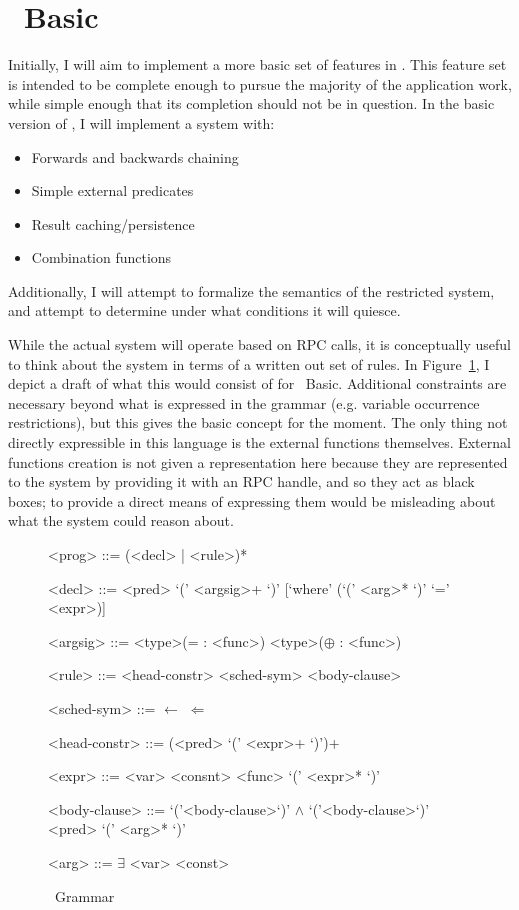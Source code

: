 \section{\sysname\ Basic}
\label{sec:holmesBasic}
Initially, I will aim to implement a more basic set of features in \sysname.
This feature set is intended to be complete enough to pursue the majority of the application work, while simple enough that its completion should not be in question.
In the basic version of \sysname, I will implement a system with:
\begin{itemize}
\item Forwards and backwards chaining
\item Simple external predicates
\item Result caching/persistence
\item Combination functions
\end{itemize}
Additionally, I will attempt to formalize the semantics of the restricted system, and attempt to determine under what conditions it will quiesce.

While the actual system will operate based on RPC calls, it is conceptually useful to think about the system in terms of a written out set of rules.
In Figure~\ref{fig:holmesGrammar}, I depict a draft of what this would consist of for \sysname\ Basic.
Additional constraints are necessary beyond what is expressed in the grammar (e.g. variable occurrence restrictions), but this gives the basic concept for the moment.
The only thing not directly expressible in this language is the external functions themselves.
External functions creation is not given a representation here because they are represented to the system by providing it with an RPC handle, and so they act as black boxes;
to provide a direct means of expressing them would be misleading about what the system could reason about.

\begin{figure}
\begin{grammar}

<prog> ::= (<decl> | <rule>)*

<decl> ::= <pred> `(' <argsig>+ `)' [`where' (`(' <arg>* `)' `=' <expr>)]

<argsig>
::=  <type>(= : <func>)
\alt <type>($\oplus$ : <func>)

<rule> ::= <head-constr> <sched-sym> <body-clause>

<sched-sym> ::= $\leftarrow$
\alt $\Leftarrow$

<head-constr> ::= (<pred> `(' <expr>+ `)')+

<expr> ::= <var>
\alt <consnt>
\alt <func> `(' <expr>* `)'

<body-clause>
::=  `('<body-clause>`)' $\wedge$ `('<body-clause>`)'
\alt <pred> `(' <arg>* `)'

<arg> ::= $\exists$ \alt <var> \alt <const>
\end{grammar}
\label{fig:holmesGrammar}
\caption{\sysname\ Grammar}
\end{figure}

